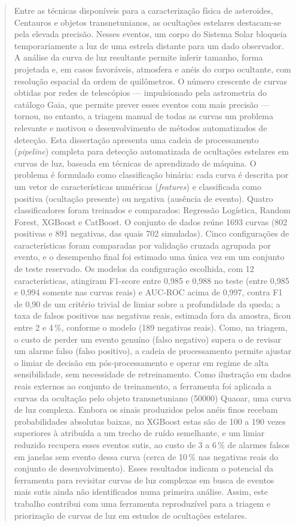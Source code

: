 \documentclass[msc]{on} %
\begin{document}
\begin{abstract}
Entre as técnicas disponíveis para a caracterização física de asteroides, Centauros e objetos transnetunianos, as ocultações estelares destacam-se pela elevada precisão. Nesses eventos, um corpo do Sistema Solar bloqueia temporariamente a luz de uma estrela distante para um dado observador. A análise da curva de luz resultante permite inferir tamanho, forma projetada e, em casos favoráveis, atmosfera e anéis do corpo ocultante, com resolução espacial da ordem de quilômetros. O número crescente de curvas obtidas por redes de telescópios --- impulsionado pela astrometria do catálogo Gaia, que permite prever esses eventos com mais precisão --- tornou, no entanto, a triagem manual de todas as curvas um problema relevante e motivou o desenvolvimento de métodos automatizados de detecção. Esta dissertação apresenta uma cadeia de processamento (\textit{pipeline}) completa para detecção automatizada de ocultações estelares em curvas de luz, baseada em técnicas de aprendizado de máquina. O problema é formulado como classificação binária: cada curva é descrita por um vetor de características numéricas (\textit{features}) e classificada como positiva (ocultação presente) ou negativa (ausência de evento). Quatro classificadores foram treinados e comparados: Regressão Logística, Random Forest, XGBoost e CatBoost. O conjunto de dados reúne 1693 curvas (802 positivas e 891 negativas, das quais 702 simuladas). Cinco configurações de características foram comparadas por validação cruzada agrupada por evento, e o desempenho final foi estimado uma única vez em um conjunto de teste reservado. Os modelos da configuração escolhida, com 12 características, atingiram F1-score entre 0,985 e 0,988 no teste (entre 0,985 e 0,994 somente nas curvas reais) e AUC-ROC acima de 0,997, contra F1 de 0,90 de um critério trivial de limiar sobre a profundidade da queda; a taxa de falsos positivos nas negativas reais, estimada fora da amostra, ficou entre 2 e 4\,\%, conforme o modelo (189 negativas reais). Como, na triagem, o custo de perder um evento genuíno (falso negativo) supera o de revisar um alarme falso (falso positivo), a cadeia de processamento permite ajustar o limiar de decisão em pós-processamento e operar em regime de alta sensibilidade, sem necessidade de retreinamento. Como ilustração em dados reais externos ao conjunto de treinamento, a ferramenta foi aplicada a curvas da ocultação pelo objeto transnetuniano (50000) Quaoar, uma curva de luz complexa. Embora os sinais produzidos pelos anéis finos recebam probabilidades absolutas baixas, no XGBoost estas são de 100 a 190 vezes superiores à atribuída a um trecho de ruído semelhante, e um limiar reduzido recupera esses eventos sutis, ao custo de 3 a 6\,\% de alarmes falsos em janelas sem evento dessa curva (cerca de 10\,\% nas negativas reais do conjunto de desenvolvimento). Esses resultados indicam o potencial da ferramenta para revisitar curvas de luz complexas em busca de eventos mais sutis ainda não identificados numa primeira análise. Assim, este trabalho contribui com uma ferramenta reproduzível para a triagem e priorização de curvas de luz em estudos de ocultações estelares.
\end{abstract}
\end{document}

